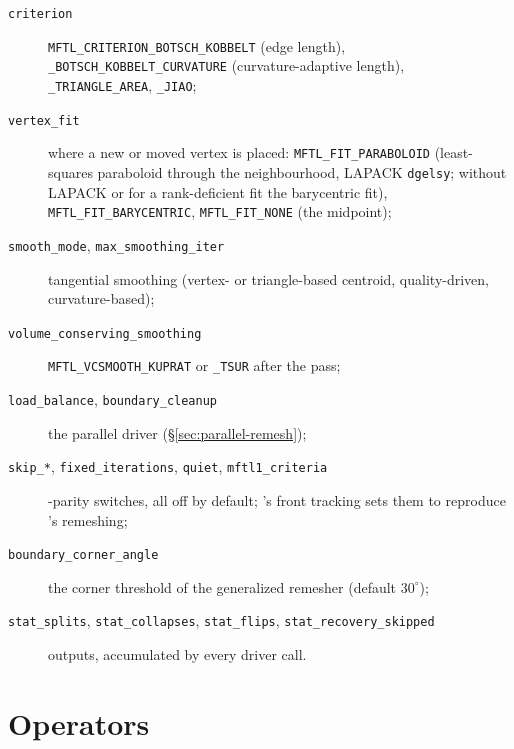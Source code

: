 \begin{description}
  \item[\texttt{criterion}] \texttt{MFTL\_CRITERION\_BOTSCH\_KOBBELT} (edge length),
    \texttt{\_BOTSCH\_KOBBELT\_CURVATURE} (curvature-adaptive length),
    \texttt{\_TRIANGLE\_AREA}, \texttt{\_JIAO};
  \item[\texttt{vertex\_fit}] where a new or moved vertex is placed: \texttt{MFTL\_FIT\_PARABOLOID}
    (least-squares paraboloid through the neighbourhood, LAPACK \texttt{dgelsy}; without LAPACK or
    for a rank-deficient fit the barycentric fit), \texttt{MFTL\_FIT\_BARYCENTRIC},
    \texttt{MFTL\_FIT\_NONE} (the midpoint);
  \item[\texttt{smooth\_mode}, \texttt{max\_smoothing\_iter}] tangential smoothing (vertex- or
    triangle-based centroid, quality-driven, curvature-based);
  \item[\texttt{volume\_conserving\_smoothing}] \texttt{MFTL\_VCSMOOTH\_KUPRAT} or
    \texttt{\_TSUR} after the pass;
  \item[\texttt{load\_balance}, \texttt{boundary\_cleanup}] the parallel driver
    (\S\ref{sec:parallel-remesh});
  \item[\texttt{skip\_*}, \texttt{fixed\_iterations}, \texttt{quiet}, \texttt{mftl1\_criteria}]
    \mftlone-parity switches, all off by default; \multi's front tracking sets them to reproduce
    \mftlone's remeshing;
  \item[\texttt{boundary\_corner\_angle}] the corner threshold of the generalized remesher
    (default $30^\circ$);
  \item[\texttt{stat\_splits}, \texttt{stat\_collapses}, \texttt{stat\_flips},
    \texttt{stat\_recovery\_skipped}] outputs, accumulated by every driver call.
\end{description}

\section{Operators}

